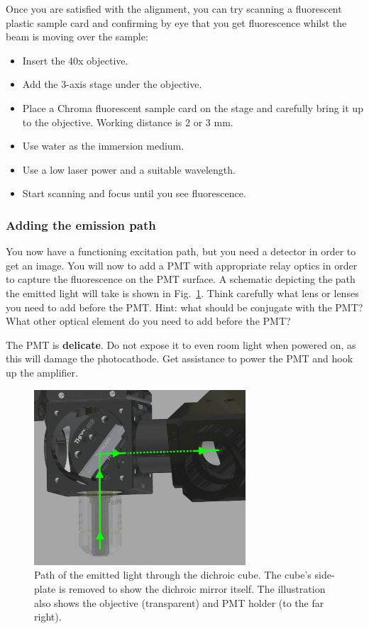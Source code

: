 \documentclass[a4paper]{report}
\begin{document}
Once you are satisfied with the alignment, you can try scanning a fluorescent plastic sample card and confirming by eye that you get fluorescence whilst the beam is moving over the sample:
\begin{itemize}
    \setlength\itemsep{0.15em}
     \item Insert the 40x objective.
     \item Add the 3-axis stage under the objective.
     \item Place a Chroma fluorescent sample card on the stage and carefully bring it up to the objective. Working distance is 2 or 3 mm. 
     \item Use water as the immersion medium.
     \item Use a low laser power and a suitable wavelength. 
     \item Start scanning and focus until you see fluorescence.
 \end{itemize}

\clearpage

\subsubsection{Adding the emission path}
You now have a functioning excitation path, but you need a detector in order to get an image. 
You will now to add a PMT with appropriate relay optics in order to capture the fluorescence on the PMT surface. 
A schematic depicting the path the emitted light will take is shown in Fig.~\ref{fig:dichroic_holder_paths}.
Think carefully what lens or lenses you need to add before the PMT. 
Hint: what should be conjugate with the PMT?
What other optical element do you need to add before the PMT?

The PMT is \textbf{delicate}. 
Do not expose it to even room light when powered on, as this will damage the photocathode. 
Get assistance to power the PMT and hook up the amplifier. 
\begin{figure}[h]
\center
\includegraphics[width=3.1in]{cube_emission_cutout.eps}
\caption{Path of the emitted light through the dichroic cube. The cube's side-plate is removed to show the dichroic mirror itself. The illustration also shows the objective (transparent) and PMT holder (to the far right).}
\label{fig:dichroic_holder_paths}
\end{figure}
\end{document}
